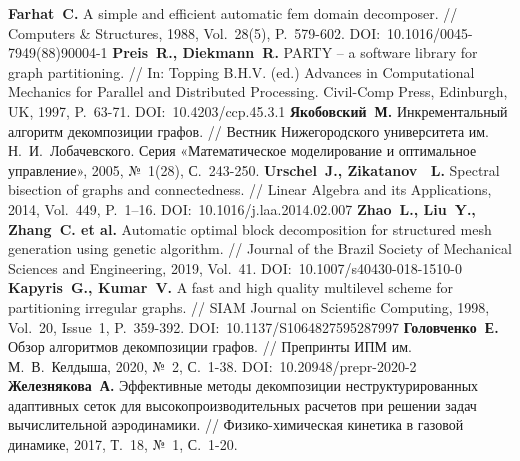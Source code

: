 \begin{thebibliography}{99}
%
\textbf{Farhat~C.} A simple and efficient automatic fem domain decomposer. // Computers \& Structures, 1988, Vol.~28(5), P.~579-602. DOI:~10.1016/0045-7949(88)90004-1
%
\textbf{Preis~R., Diekmann~R.} PARTY -- a software library for graph partitioning. // In: Topping B.H.V. (ed.) Advances in Computational Mechanics for Parallel and Distributed Processing. Civil-Comp Press, Edinburgh, UK, 1997, P.~63-71. DOI:~10.4203/ccp.45.3.1 
%
\textbf{Якобовский~М.} Инкрементальный алгоритм декомпозиции графов. // Вестник Нижегородского университета им. Н.~И.~Лобачевского. Серия «Математическое моделирование и оптимальное управление», 2005, №~1(28), С.~243-250.
%
\textbf{Urschel~J., Zikatanov~ L.} Spectral bisection of graphs and connectedness. // Linear Algebra and its Applications, 2014, Vol.~449, P.~1–16. DOI:~10.1016/j.laa.2014.02.007
%
\textbf{Zhao~L., Liu~Y., Zhang~C. et al.} Automatic optimal block decomposition for structured mesh generation using genetic algorithm. // Journal of the Brazil Society of Mechanical Sciences and Engineering, 2019, Vol.~41. DOI:~10.1007/s40430-018-1510-0
%
\textbf{Kapyris~G., Kumar~V.} A fast and high quality multilevel scheme for partitioning irregular graphs. // SIAM Journal on Scientific Computing, 1998, Vol.~20, Issue~1, P.~359-392. DOI:~10.1137/S1064827595287997
%
\textbf{Головченко~Е.} Обзор алгоритмов декомпозиции графов. // Препринты ИПМ им. М.~В.~Келдыша, 2020, №~2, С.~1-38. DOI:~10.20948/prepr-2020-2
%
\textbf{Железнякова~А.} Эффективные методы декомпозиции неструктурированных адаптивных сеток для высокопроизводительных расчетов при решении задач вычислительной аэродинамики. // Физико-химическая кинетика в газовой динамике, 2017, Т.~18, №~1, С.~1-20.
%



%
%




\end{thebibliography}
